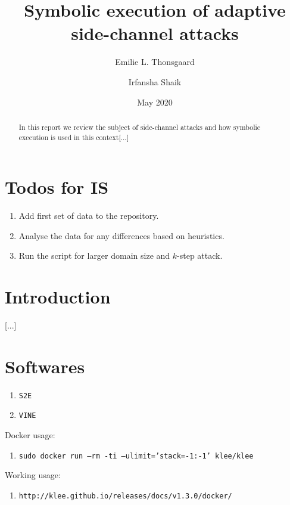 \documentclass[11pt,a4paper,notitlepage]{article}
\title{Symbolic execution of adaptive side-channel attacks}
\author{Emilie L. Thonsgaard \and Irfansha Shaik}
\date{May 2020}
\begin{document}
\begin{titlingpage}
    \maketitle
    \begin{abstract}
        In this report we review the subject of side-channel attacks and how symbolic execution is used in this context[...]
    \end{abstract}
\end{titlingpage}

\tableofcontents
\newpage
\setcounter{section}{-1}


\section{Todos for IS}
\label{sec:todosforis}

\begin{enumerate}
  \item Add first set of data to the repository.
  \item Analyse the data for any differences based on heuristics.
  \item Run the script for larger domain size and $k$-step attack.
\end{enumerate}

\newpage

\section{Introduction}
\label{cha:introduction}

[...]

\newpage

\section{Softwares}
\label{cha:softwares}

\begin{enumerate}
    \item \texttt{S2E}
    \item \texttt{VINE}
\end{enumerate}

Docker usage:
\begin{enumerate}
    \item \texttt{sudo docker run --rm -ti --ulimit='stack=-1:-1' klee/klee}
\end{enumerate}

Working usage:
\begin{enumerate}
    \item \texttt{http://klee.github.io/releases/docs/v1.3.0/docker/}
\end{enumerate}
\end{document}
